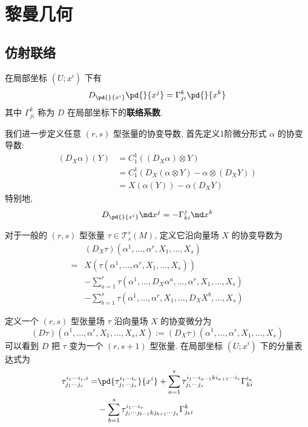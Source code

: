 \chapter{黎曼几何}
\section{仿射联络}
    在局部坐标 $\left(U;x^i\right)$ 下有
    \begin{equation*}
        D_{\pd{}{x^i}}\pd{}{x^j}=\Gamma^{k}_{ji}\pd{}{x^k}
    \end{equation*}
    其中 $\Gamma^{k}_{ji}$ 称为 $D$ 在局部坐标下的\textbf{联络系数}.

    我们进一步定义任意 $(r,s)$ 型张量的协变导数, 首先定义1阶微分形式 $\alpha$ 的协变导数:
    \begin{align*}
        \left(D_{X}\alpha\right)(Y) &= C^1_1\left((D_X\alpha)\otimes Y\right) \\
        &= C^1_1\left(D_X(\alpha\otimes Y)-\alpha\otimes(D_XY)\right) \\
        &= X(\alpha(Y))-\alpha(D_XY)
    \end{align*}
    特别地,
    \begin{equation*}
        D_{\pd{}{x^i}}{\md x^j} = -\Gamma_{ki}^j{\md x^k}
    \end{equation*}

    对于一般的 $(r,s)$ 型张量 $\tau\in\mathcal{T}^r_s(M)$, 定义它沿向量场 $X$ 的协变导数为
    \begin{align*}
        &(D_X\tau)(\alpha^1,\dots,\alpha^r,X_1,\dots,X_s) \\
        =& X\left(\tau(\alpha^1,\dots,\alpha^r,X_1,\dots,X_s)\right) \\
        &-\sum_{a=1}^{r}\tau\left(\alpha^1,\dots,D_X\alpha^a,\dots,\alpha^r,X_1,\dots,X_s\right) \\
        &-\sum_{b=1}^{s}\tau\left(\alpha^1,\dots,\alpha^r,X_1,\dots,D_X{X^b},\dots,X_s\right)
    \end{align*}

    定义一个 $(r,s)$ 型张量场 $\tau$ 沿向量场 $X$ 的协变微分为
    \begin{equation*}
        (D\tau)(\alpha^1,\dots,\alpha^r,X_1,\dots,X_s,X):=(D_X\tau)(\alpha^1,\dots,\alpha^r,X_1,\dots,X_s)
    \end{equation*}
    可以看到 $D$ 把 $\tau$ 变为一个 $(r,s+1)$ 型张量. 在局部坐标 $\left(U;x^i\right)$ 下的分量表达式为
    \begin{align*}
        \tau^{i_1\cdots i_r,i}_{j_1\cdots j_s} =& \pd{\tau^{i_1\cdots i_r}_{j_1\cdots j_s}}{x^i} + \sum_{a=1}^{r}\tau^{i_1\cdots i_{a-1}k i_{a+1}\cdots i_r}_{j_1\cdots j_s}\Gamma^{i_a}_{ki} \\
        & -\sum_{b=1}^{s}\tau^{i_1\cdots i_r}_{j_i\cdots j_{b-1}k j_{b+1}\cdots j_s}\Gamma^{k}_{j_b i}
    \end{align*}

